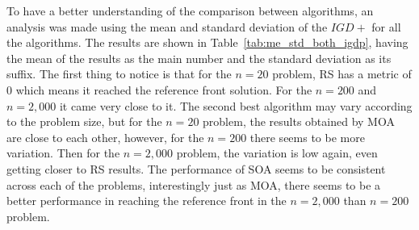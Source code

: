 To have a better understanding of the comparison between algorithms, an analysis was made using the mean and standard deviation of the $IGD+$ for all the algorithms. The results are shown in Table~\ref{tab:me_std_both_igdp}, having the mean of the results as the main number and the standard deviation as its suffix. The first thing to notice is that for the $n=20$ problem, RS has a metric of 0 which means it reached the reference front solution. For the $n=200$ and $n=2,000$ it came very close to it. The second best algorithm may vary according to the problem size, but for the $n=20$ problem, the results obtained by MOA are close to each other, however, for the $n=200$ there seems to be more variation. Then for the $n=2,000$ problem, the variation is low again, even getting closer to RS results. The performance of SOA seems to be consistent across each of the problems, interestingly just as MOA, there seems to be a better performance in reaching the reference front in the $n=2,000$ than $n=200$ problem.

